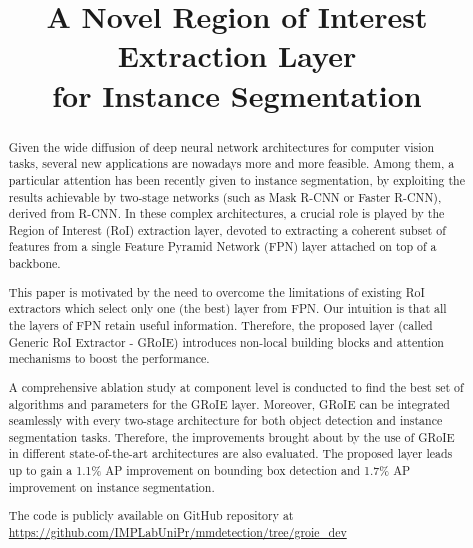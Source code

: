 \documentclass[10pt,conference,a4paper]{IEEEtran}
\begin{document}
\title{A Novel Region of Interest Extraction Layer\\for Instance Segmentation}


\author{
\and
{}
\and
{}
}










\maketitle

\begin{abstract}
Given the wide diffusion of deep neural network architectures for computer vision tasks, several new applications are nowadays more and more feasible. Among them, a particular attention has been recently given to instance segmentation, by exploiting the results achievable by two-stage networks (such as Mask R-CNN or Faster R-CNN), derived from R-CNN. In these complex architectures, a crucial role is played by the Region of Interest (RoI) extraction layer, devoted to extracting a coherent subset of features from a single Feature Pyramid Network (FPN) layer attached on top of a backbone.

This paper is motivated by the need to overcome the limitations of existing RoI extractors which select only one (the best) layer from FPN. Our intuition is that all the layers of FPN retain useful information. Therefore, the proposed layer (called Generic RoI Extractor - GRoIE) introduces non-local building blocks and attention mechanisms to boost the performance.

A comprehensive ablation study at component level is conducted to find the best set of algorithms and parameters for the GRoIE layer. 
Moreover, GRoIE can be integrated seamlessly with every two-stage architecture for both object detection and instance segmentation tasks. Therefore, the improvements brought about by the use of GRoIE in different state-of-the-art architectures are also evaluated. 
The proposed layer leads up to gain a 1.1\% AP improvement on bounding box detection and 1.7\% AP improvement on instance segmentation.

The code is publicly available on GitHub repository at \url{https://github.com/IMPLabUniPr/mmdetection/tree/groie_dev}
\end{abstract}
 
\end{document}
